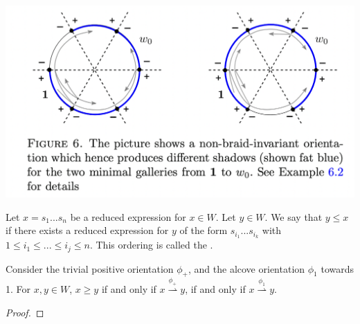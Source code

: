 \documentclass[11pt]{article}
\begin{document}
\includegraphics[scale=0.6]{Screenshot 2023-02-08 at 10.39.18.png}\\

\begin{definition}
    Let $x=s_1...s_n$ be a reduced expression for $x\in W$. Let $y\in W$. We say that $y\leq x$ if there exists a reduced expression for $y$ of the form $s_{i_1}...s_{i_k}$ with $1\leq i_1\leq...\leq i_j\leq n$. This ordering is called the .
\end{definition}

\begin{proposition}
    Consider the trivial positive orientation $\phi_+$, and the alcove orientation $\phi_1$ towards 1. For $x,y\in W$, $x\geq y$ if and only if $x\stackrel{\phi_+}{\rightharpoonup} y$, if and only if $x\stackrel{\phi_1}{\rightharpoonup} y$.
\end{proposition}

\begin{proof}
    
\end{proof}


















\end{document}
